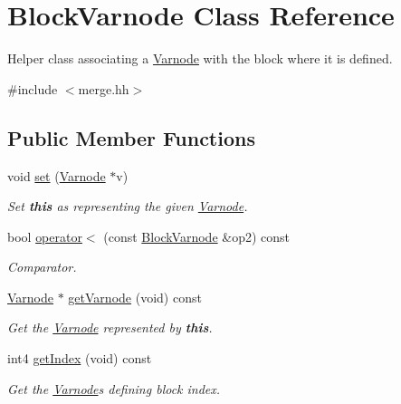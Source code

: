 \hypertarget{class_block_varnode}{}\section{Block\+Varnode Class Reference}
\label{class_block_varnode}


Helper class associating a \mbox{\hyperlink{class_varnode}{Varnode}} with the block where it is defined.  




{\ttfamily \#include $<$merge.\+hh$>$}

\subsection*{Public Member Functions}
\begin{DoxyCompactItemize}
\item 
void \mbox{\hyperlink{class_block_varnode_af4aa0725ff5d05784b84fe6db6a69480}{set}} (\mbox{\hyperlink{class_varnode}{Varnode}} $\ast$v)
\begin{DoxyCompactList}\small\item\em Set {\bfseries{this}} as representing the given \mbox{\hyperlink{class_varnode}{Varnode}}. \end{DoxyCompactList}\item 
bool \mbox{\hyperlink{class_block_varnode_a2946b402e8612fd8d690b85929b8fec6}{operator$<$}} (const \mbox{\hyperlink{class_block_varnode}{Block\+Varnode}} \&op2) const
\begin{DoxyCompactList}\small\item\em Comparator. \end{DoxyCompactList}\item 
\mbox{\hyperlink{class_varnode}{Varnode}} $\ast$ \mbox{\hyperlink{class_block_varnode_af6e07968e7891b7e7e75e92351de0ba1}{get\+Varnode}} (void) const
\begin{DoxyCompactList}\small\item\em Get the \mbox{\hyperlink{class_varnode}{Varnode}} represented by {\bfseries{this}}. \end{DoxyCompactList}\item 
int4 \mbox{\hyperlink{class_block_varnode_a51eeb35ed7db7fefa0cfd52ec9b719ac}{get\+Index}} (void) const
\begin{DoxyCompactList}\small\item\em Get the \mbox{\hyperlink{class_varnode}{Varnode}}\textquotesingle{}s defining block index. \end{DoxyCompactList}\end{DoxyCompactItemize}

